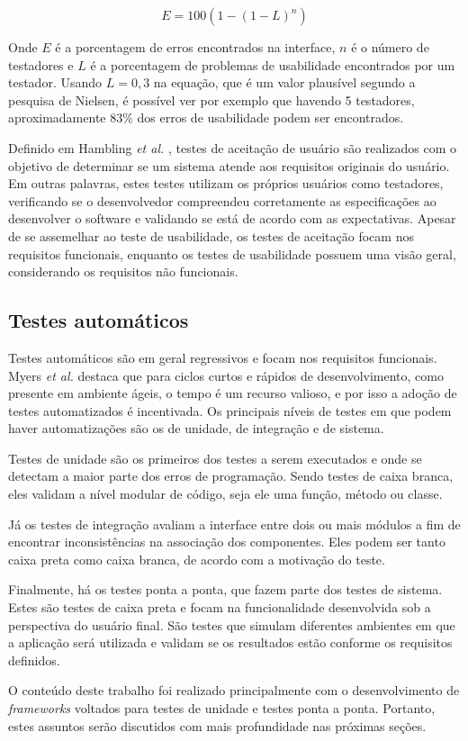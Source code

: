 \[ E = 100(1 - (1 - L)^n)\]

Onde $E$ é a porcentagem de erros encontrados na interface, $n$ é o número de testadores e $L$ é a porcentagem de problemas de usabilidade encontrados por um testador. Usando $L = 0,3$ na equação, que é um valor plausível segundo a pesquisa de Nielsen, é possível ver por exemplo que havendo 5 testadores, aproximadamente 83\% dos erros de usabilidade podem ser encontrados.

Definido em Hambling \emph{et al.} \cite{hambling}, testes de aceitação de usuário são realizados com o objetivo de determinar se um sistema atende aos requisitos originais do usuário. Em outras palavras, estes testes utilizam os próprios usuários como testadores, verificando se o desenvolvedor compreendeu corretamente as especificações ao desenvolver o software e validando se está de acordo com as expectativas. Apesar de se assemelhar ao teste de usabilidade, os testes de aceitação focam nos requisitos funcionais, enquanto os testes de usabilidade possuem uma visão geral, considerando os requisitos não funcionais.

\hypertarget{testes-automaticos}{%
\subsection{Testes automáticos}\label{testes-automaticos}}

Testes automáticos são em geral regressivos e focam nos requisitos funcionais. Myers \emph{et al.} \cite{myers} destaca que para ciclos curtos e rápidos de desenvolvimento, como presente em ambiente ágeis, o tempo é um recurso valioso, e por isso a adoção de testes automatizados é incentivada. Os principais níveis de testes em que podem haver automatizações são os de unidade, de integração e de sistema.

Testes de unidade são os primeiros dos testes a serem executados e onde se detectam a maior parte dos erros de programação. Sendo testes de caixa branca, eles validam a nível modular de código, seja ele uma função, método ou classe.

Já os testes de integração avaliam a interface entre dois ou mais módulos a fim de encontrar inconsistências na associação dos componentes. Eles podem ser tanto caixa preta como caixa branca, de acordo com a motivação do teste.

Finalmente, há os testes ponta a ponta, que fazem parte dos testes de sistema. Estes são testes de caixa preta e focam na funcionalidade desenvolvida sob a perspectiva do usuário final. São testes que simulam diferentes ambientes em que a aplicação será utilizada e validam se os resultados estão conforme os requisitos definidos.

O conteúdo deste trabalho foi realizado principalmente com o desenvolvimento de \emph{frameworks} voltados para testes de unidade e testes ponta a ponta. Portanto, estes assuntos serão discutidos com mais profundidade nas próximas seções.
